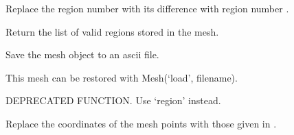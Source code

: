 \documentclass[a4paper,11pt,english]{sphinxmanual}
\begin{document}
\begin{fulllineitems}
\begin{fulllineitems}
\end{fulllineitems}


\begin{fulllineitems}
\label{\detokenize{python/cmdref_Mesh:getfem.Mesh.region_subtract}}
Replace the region number  with its difference with region
number .

\end{fulllineitems}


\begin{fulllineitems}
\label{\detokenize{python/cmdref_Mesh:getfem.Mesh.regions}}
Return the list of valid regions stored in the mesh.

\end{fulllineitems}


\begin{fulllineitems}
\label{\detokenize{python/cmdref_Mesh:getfem.Mesh.save}}
Save the mesh object to an ascii file.

This mesh can be restored with Mesh(‘load’, filename).

\end{fulllineitems}


\begin{fulllineitems}
\label{\detokenize{python/cmdref_Mesh:getfem.Mesh.set_boundary}}
DEPRECATED FUNCTION. Use ‘region’ instead.

\end{fulllineitems}


\begin{fulllineitems}
\label{\detokenize{python/cmdref_Mesh:getfem.Mesh.set_pts}}
Replace the coordinates of the mesh points with those given in .


\end{fulllineitems}
\end{fulllineitems}
\end{document}
